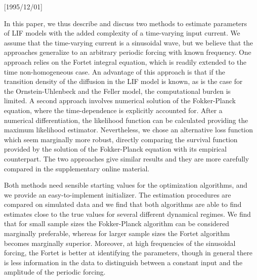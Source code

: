 \NeedsTeXFormat{LaTeX2e}[1995/12/01] \documentclass[10pt]{bmc_article}
\newenvironment{bmcformat}{\begin{raggedright}\baselineskip20pt\sloppy\setboolean{publ}{false}}{\end{raggedright}\baselineskip20pt\sloppy}
\begin{document}
\begin{bmcformat}
In this paper, we thus describe and discuss two methods to estimate parameters
of LIF models with the added complexity of a time-varying input current. We
assume that the time-varying current is a sinusoidal wave, but we believe that
the approaches generalize to an arbitrary periodic forcing with known frequency.
One approach relies on the Fortet integral equation, which is readily extended
to the time non-homogeneous case. An advantage of this approach is that if the
transition density of the diffusion in the LIF model is known, as is the case
for the Ornstein-Uhlenbeck and the Feller model, the computational burden is
limited. A second approach involves numerical solution of the Fokker-Planck
equation, where the time-dependence is explicitly accounted for. After a
numerical differentiation, the likelihood function can be calculated providing
the maximum likelihood estimator. Nevertheless, we chose an alternative loss
function which seem marginally more robust, directly comparing the survival
function provided by the solution of the Fokker-Planck equation with its
empirical counterpart. The two approaches give similar results and they are more
carefully compared in the supplementary online material.

Both methods need sensible starting values for the optimization
algorithms, and we provide an easy-to-implement initializer. The estimation
procedures are compared on simulated data and we find that both algorithms are
able to find estimates close to the true values for several different dynamical
regimes. We find that for small sample sizes the Fokker-Planck algorithm can be
considered marginally preferable, whereas for larger sample sizes the Fortet
algorithm becomes marginally superior. Moreover, at high frequencies of the
sinusoidal forcing, the Fortet is better at identifying the parameters, though in general
there is less information in the data to distinguish between a constant input
and the amplitude of the periodic forcing.


\end{bmcformat}
\end{document}
